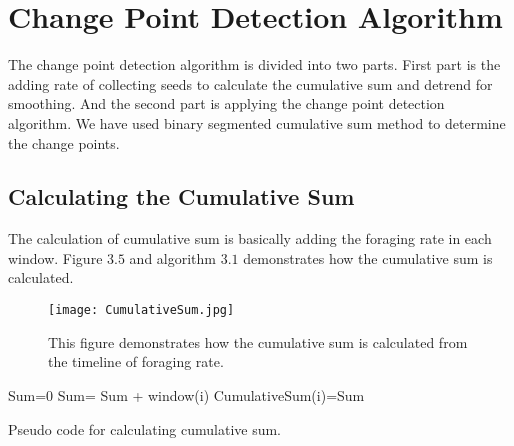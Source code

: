 \section{\label{section:Change Point Detection Algorithm}Change Point Detection Algorithm}
 The change point detection algorithm is divided into two parts. First part is the adding rate of collecting seeds to calculate the cumulative sum and detrend for smoothing. And the second part is applying the change point detection algorithm. We have used binary segmented cumulative sum method to determine the change points.
 \subsection{\label{Calculating the Cumulative Sum}Calculating the Cumulative Sum}
 The calculation of cumulative sum is basically adding the foraging rate in each window. Figure $3.5$ and algorithm $3.1$ demonstrates how the cumulative sum is calculated.\par
 \begin{figure}[h]
 	\texttt{[image: CumulativeSum.jpg]}
 	\caption{This figure demonstrates how the cumulative sum is calculated from the timeline of foraging rate.}
 \end{figure}

 \begin{algorithm}[H]
 	\begin{algorithmic}[1]
 		\State Sum=0
 			\State Sum= Sum + window(i)
 			\State CumulativeSum(i)=Sum
 		\EndFor
 		\caption{Pseudo code for calculating cumulative sum.}
 		\label{Pseudo code for calculating cumulative sum.}
 	\end{algorithmic}
 \end{algorithm}
 
